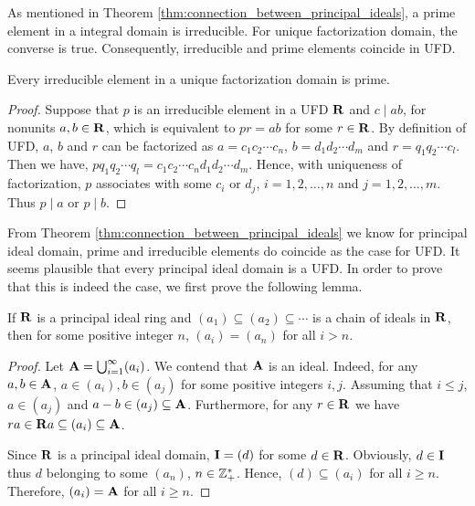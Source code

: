 As mentioned in Theorem \ref{thm:connection_between_principal_ideals}, a 
prime element in a integral domain is irreducible. 
For unique factorization domain, the converse is true. 
Consequently, irreducible and prime elements coincide in UFD. 
\begin{prop}
\label{prop:rings:irreducible_prime_UFD}
Every irreducible element in a unique factorization domain is prime. 
\end{prop}
\begin{proof}
Suppose that $p$ is an irreducible element in a UFD $\mathbf{R}$ and $c \mid ab$, 
for nonunits $a, b \in \mathbf{R}$, which is equivalent to $pr = ab$ for some 
$r \in \mathbf{R}$. 
By definition of UFD, $a$, $b$ and $r$ can be factorized as $a = c_1c_2 
\cdots c_n$, $b = d_1d_2 \cdots d_m$ and $r = q_1q_2 \cdots c_l$. 
Then we have, $pq_1q_2 \cdots q_l = c_1c_2 \cdots c_n d_1 d_2 \cdots d_m$. 
Hence, with uniqueness of factorization, $p$ associates with some $c_i$ or 
$d_j$, $i=1, 2, \ldots, n$ and $j=1, 2, \ldots, m$. Thus $p \mid a$ or 
$p \mid b$. 
\end{proof}

From Theorem \ref{thm:connection_between_principal_ideals} we know for 
principal ideal domain, prime and irreducible elements do coincide as the 
case for UFD. 
It seems plausible that every principal ideal domain is a UFD. 
In order to prove that this is indeed the case, we first prove the following 
lemma. 

\begin{lemma}
\label{lemma:rings:finite_chain_of_principal_ideal_domain}
If $\mathbf{R}$ is a principal ideal ring and $(a_1) \subseteq (a_2) \subseteq \cdots$ 
is a chain of ideals in $\mathbf{R}$, then for some positive integer $n$, $(a_i) = 
(a_{n})$ for all $i > n$. 
\end{lemma}
\begin{proof}
Let $\mathbf{A} = \bigcup_{i=1}^\infty (a_i)$. We contend that $\mathbf{A}$ is an ideal. 
Indeed, for any $a, b \in \mathbf{A}$, $a \in (a_i), b \in (a_j)$ for some positive 
integers $i, j$. 
Assuming that $i \le j$, $a \in (a_j)$ and $a - b \in (a_j) \subseteq \mathbf{A}$. 
Furthermore, for any $r \in \mathbf{R}$ we have $ra \in \mathbf{R} a \subseteq (a_i) \subseteq 
\mathbf{A}$.

Since $\mathbf{R}$ is a principal ideal domain, $\mathbf{I} = (d)$ for some $d \in \mathbf{R}$. 
Obviously, $d \in \mathbf{I}$ thus $d$ belonging to some $(a_n)$, $n \in 
\mathbb{Z}^\ast_+$. 
Hence, $(d) \subseteq (a_i)$ for all $i \ge n$. 
Therefore, $(a_i) = \mathbf{A}$ for all $i \ge n$. 
\end{proof}


